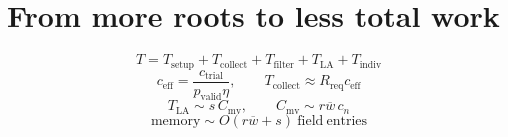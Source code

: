 \documentclass{article}
\begin{document}
\section*{From more roots to less total work}
\[
T=T_{\mathrm{setup}}+T_{\mathrm{collect}}+T_{\mathrm{filter}}+T_{\mathrm{LA}}+T_{\mathrm{indiv}}
\]
\[
c_{\mathrm{eff}}=\frac{c_{\mathrm{trial}}}{p_{\mathrm{valid}}\eta},\qquad T_{\mathrm{collect}}\approx R_{\mathrm{req}}c_{\mathrm{eff}}
\]
\[
T_{\mathrm{LA}}\sim s\,C_{\mathrm{mv}},\qquad C_{\mathrm{mv}}\sim r\overline{w}\,c_n
\]
\[
\mathrm{memory}\sim O(r\overline{w}+s)\ \mathrm{field\ entries}
\]
\end{document}
